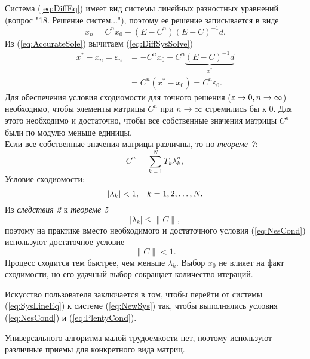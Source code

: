 \documentclass[a4paper,11pt]{article}
\begin{document}
\noindent Система (\ref{eq:DiffEq}) имеет вид системы линейных разностных уравнений (вопрос "18. Решение систем..."), поэтому ее решение записывается в виде
\begin{equation}
  x_n = C^nx_0 + (E-C^n)(E-C)^{-1}d.
  \label{eq:DiffSysSolve}
\end{equation}
Из (\ref{eq:AccurateSole}) вычитаем (\ref{eq:DiffSysSolve})
\begin{align*}
  x^*-x_n = \varepsilon_n &= -C^nx_0 + C^n\underbrace{(E-C)^{-1}d}_{x^*} \\
  &= C^n(x^*-x_0) = C^n\varepsilon_0.
\end{align*}
Для обеспечения условия сходиомости для точного решения ($\varepsilon \rightarrow 0, \hspace{2mm}\\ n \rightarrow \infty$) необходимо, чтобы элементы матрицы $C^n$
при $n \rightarrow \infty$ стремились бы к $0$. Для этого необходимо и достаточно, чтобы все собственные значения матрицы $C^n$
были по модулю меньше единицы. \\
Если все собственные значения матрицы различны, то по \textit{теореме 7}:
\begin{equation*}
  C^n = \sum_{k=1}^N T_k\lambda_k^n,
\end{equation*}
Условие сходиомости:
\begin{equation}
  |\lambda_k|<1, \hspace{3mm} k=1,2,\dots,N.
  \label{eq:NesCond}
\end{equation}
Из \textit{следствия 2} к \textit{теореме 5} \[|\lambda_k|\le\parallel C\parallel,\]
поэтому на практике вместо необходимого и достаточного условия (\ref{eq:NesCond}) используют достаточное условие
\begin{equation}
  \parallel C\parallel < 1.
  \label{eq:PlentyCond}
\end{equation}
Процесс сходится тем быстрее, чем меньше $\lambda_k$.
Выбор $x_0$ не влияет на факт сходимости, но его удачный выбор сокращает количество итераций.
\begin{importantblock}
  Искусство пользователя заключается в том, чтобы перейти от системы (\ref{eq:SysLineEq}) к системе (\ref{eq:NewSys}) так,
  чтобы выполнялись условия (\ref{eq:NesCond}) и (\ref{eq:PlentyCond}).
\end{importantblock}

\noindent Универсального алгоритма малой трудоемкости нет, поэтому используют различные приемы для конкретного вида матриц.\\
\end{document}

